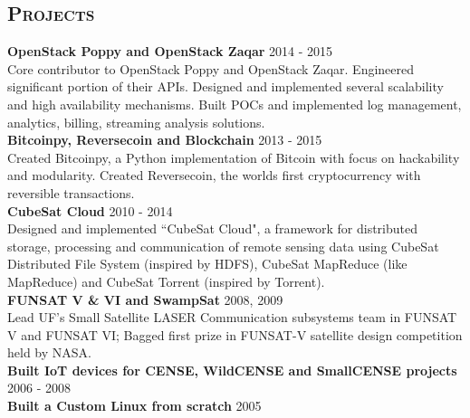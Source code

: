 \begin{resume}
\section{\textsc{Projects}}
\textbf{OpenStack Poppy and OpenStack Zaqar} \hfill 2014 - 2015\\
Core contributor to OpenStack Poppy and OpenStack Zaqar. Engineered significant portion of their APIs. Designed and implemented several scalability and high availability mechanisms. Built POCs and implemented log management, analytics, billing, streaming analysis solutions.\\
\textbf{Bitcoinpy, Reversecoin and Blockchain} \hfill 2013 - 2015\\
Created Bitcoinpy, a Python implementation of Bitcoin with focus on hackability and modularity. Created Reversecoin, the worlds first cryptocurrency with reversible transactions.\\
\textbf{CubeSat Cloud} \hfill 2010 - 2014 \\
Designed and implemented ``CubeSat Cloud", a framework for distributed storage, processing and communication of remote sensing data using CubeSat Distributed File System (inspired by HDFS), CubeSat MapReduce (like MapReduce) and CubeSat Torrent (inspired by Torrent).\\
\textbf{FUNSAT V \& VI and SwampSat} \hfill 2008, 2009 \\
Lead UF's Small Satellite LASER Communication subsystems team in FUNSAT V and FUNSAT VI; Bagged first prize in FUNSAT-V satellite design competition held by NASA.\\
\textbf{Built IoT devices for CENSE, WildCENSE and SmallCENSE projects} \hfill 2006 - 2008\\
\textbf{Built a Custom Linux from scratch} \hfill 2005








\end{resume}
